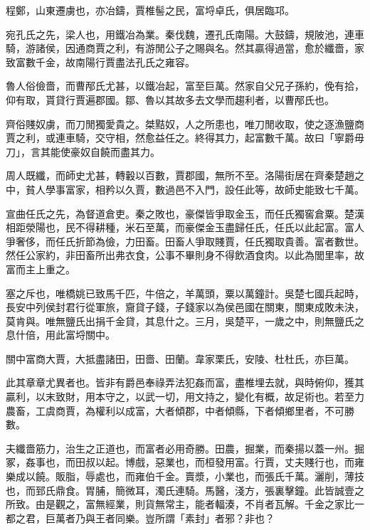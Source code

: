 \begin{pinyinscope}
程鄭，山東遷虜也，亦冶鑄，賈椎髻之民，富埒卓氏，俱居臨邛。

宛孔氏之先，梁人也，用鐵冶為業。秦伐魏，遷孔氏南陽。大鼓鑄，規陂池，連車騎，游諸侯，因通商賈之利，有游閒公子之賜與名。然其贏得過當，愈於纖嗇，家致富數千金，故南陽行賈盡法孔氏之雍容。

魯人俗儉嗇，而曹邴氏尤甚，以鐵冶起，富至巨萬。然家自父兄子孫約，俛有拾，仰有取，貰貸行賈遍郡國。鄒、魯以其故多去文學而趨利者，以曹邴氏也。

齊俗賤奴虜，而刀閒獨愛貴之。桀黠奴，人之所患也，唯刀閒收取，使之逐漁鹽商賈之利，或連車騎，交守相，然愈益任之。終得其力，起富數千萬。故曰「寧爵毋刀」，言其能使豪奴自饒而盡其力。

周人既纖，而師史尤甚，轉轂以百數，賈郡國，無所不至。洛陽街居在齊秦楚趙之中，貧人學事富家，相矜以久賈，數過邑不入門，設任此等，故師史能致七千萬。

宣曲任氏之先，為督道倉吏。秦之敗也，豪傑皆爭取金玉，而任氏獨窖倉粟。楚漢相距滎陽也，民不得耕種，米石至萬，而豪傑金玉盡歸任氏，任氏以此起富。富人爭奢侈，而任氏折節為儉，力田畜。田畜人爭取賤賈，任氏獨取貴善。富者數世。然任公家約，非田畜所出弗衣食，公事不畢則身不得飲酒食肉。以此為閭里率，故富而主上重之。

塞之斥也，唯橋姚已致馬千匹，牛倍之，羊萬頭，粟以萬鐘計。吳楚七國兵起時，長安中列侯封君行從軍旅，齎貸子錢，子錢家以為侯邑國在關東，關東成敗未決，莫肯與。唯無鹽氏出捐千金貸，其息什之。三月，吳楚平，一歲之中，則無鹽氏之息什倍，用此富埒關中。

關中富商大賈，大抵盡諸田，田嗇、田蘭。韋家栗氏，安陵、杜杜氏，亦巨萬。

此其章章尤異者也。皆非有爵邑奉祿弄法犯姦而富，盡椎埋去就，與時俯仰，獲其贏利，以末致財，用本守之，以武一切，用文持之，變化有概，故足術也。若至力農畜，工虞商賈，為權利以成富，大者傾郡，中者傾縣，下者傾鄉里者，不可勝數。

夫纖嗇筋力，治生之正道也，而富者必用奇勝。田農，掘業，而秦揚以蓋一州。掘冢，姦事也，而田叔以起。博戲，惡業也，而桓發用富。行賈，丈夫賤行也，而雍樂成以饒。販脂，辱處也，而雍伯千金。賣漿，小業也，而張氏千萬。灑削，薄技也，而郅氏鼎食。胃脯，簡微耳，濁氏連騎。馬醫，淺方，張裏擊鐘。此皆誠壹之所致。由是觀之，富無經業，則貨無常主，能者輻湊，不肖者瓦解。千金之家比一都之君，巨萬者乃與王者同樂。豈所謂「素封」者邪？非也？


\end{pinyinscope}